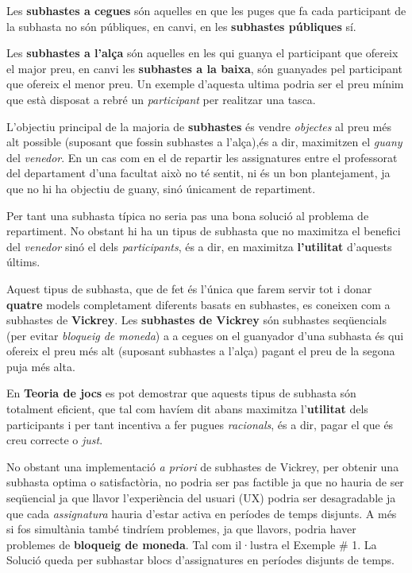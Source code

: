 \documentclass[10pt,twocolumn]{article}
\begin{document}
Les \textbf{subhastes a cegues} són aquelles en que les puges que fa cada participant de la subhasta no són públiques, en canvi, en les \textbf{subhastes públiques} sí.

Les \textbf{subhastes a l'alça} són aquelles en les qui guanya el participant que ofereix el major preu, en canvi les \textbf{subhastes a la baixa}, són guanyades pel participant que  ofereix el menor preu. Un exemple d'aquesta ultima podria ser el preu mínim que està disposat a rebré un \textit{participant} per realitzar una tasca.

L'objectiu principal de la majoria de \textbf{subhastes} és vendre \textit{objectes} al preu més alt possible (suposant que fossin subhastes a l'alça),és a dir, maximitzen el \textit{guany} del \textit{venedor}. En un cas com en el de repartir les assignatures entre el professorat del departament d'una facultat això no té sentit, ni és un bon plantejament, ja que no hi ha objectiu de guany, sinó únicament de repartiment.

Per tant una subhasta típica no seria pas una bona solució al problema de repartiment. No obstant hi ha un tipus de subhasta que no maximitza el benefici del \textit{venedor} sinó el dels \textit{participants}, és a dir, en maximitza \textbf{l'utilitat} d'aquests últims. 

Aquest tipus de subhasta, que de fet és l'única que farem servir tot i donar \textbf{quatre} models completament diferents basats en subhastes, es coneixen com a subhastes de \textbf{Vickrey}. Les \textbf{subhastes de Vickrey} són subhastes  seqüencials (per evitar \textit{bloqueig de moneda}) a a cegues on el guanyador d'una subhasta és qui ofereix el preu més alt (suposant subhastes a l'alça) pagant el preu de la segona puja més alta.

En \textbf{Teoria de jocs} es pot demostrar que aquests tipus de subhasta són totalment eficient, que tal com havíem dit abans maximitza l'\textbf{utilitat} dels participants i per tant incentiva a fer pugues \textit{racionals}, és a dir, pagar el que és creu correcte o \textit{just}.   

No obstant una implementació \textit{a priori} de subhastes de Vickrey, per obtenir una subhasta optima o satisfactòria, no podria ser pas factible  ja que no hauria de ser seqüencial ja que llavor l'experiència del usuari (UX) podria ser desagradable ja que cada \textit{assignatura} hauria d'estar activa en períodes de temps disjunts. A més si fos simultània també tindríem problemes, ja que llavors, podria haver problemes de \textbf{bloqueig de moneda}. Tal com il·lustra el Exemple \# 1. La Solució queda per subhastar blocs d'assignatures en períodes disjunts de temps.
\end{document}

